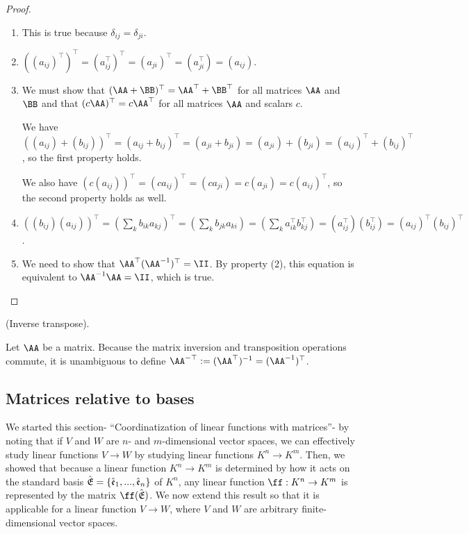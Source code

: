 \begin{proof}
    \mbox{} \\    
    \begin{enumerate}
        \item This is true because $\delta_{ij} = \delta_{ji}$.
        \item $((a_{ij})^\top)^\top = (a_{ij}^\top)^\top = (a_{ji})^\top = (a_{ji}^\top) = (a_{ij})$.
        \item We must show that $(\AA + \BB)^\top = \AA^\top + \BB^\top$ for all matrices $\AA$ and $\BB$ and that $(c\AA)^\top = c\AA^\top$ for all matrices $\AA$ and scalars $c$.

        We have $((a_{ij}) + (b_{ij}))^\top = (a_{ij} + b_{ij})^\top = (a_{ji} + b_{ji}) = (a_{ji}) + (b_{ji}) = (a_{ij})^\top + (b_{ij})^\top$, so the first property holds.

        We also have $(c(a_{ij}))^\top = (c a_{ij})^\top = (c a_{ji}) = c (a_{ji}) = c (a_{ij})^\top$, so the second property holds as well.
        
        \item $((b_{ij}) (a_{ij}))^\top = ( \sum_k b_{ik}a_{kj})^\top = (\sum_k b_{jk} a_{ki}) = (\sum_k a_{ik}^\top b_{kj}^\top) = (a_{ij}^\top) (b_{ij}^\top) = (a_{ij})^\top (b_{ij})^\top$.
        
        \item We need to show that $\AA^\top (\AA^{-1})^\top = \II$. By property (2), this equation is equivalent to $\AA^{-1} \AA = \II$, which is true.
    \end{enumerate}
\end{proof}

\begin{defn}
    (Inverse transpose).

    Let $\AA$ be a matrix. Because the matrix inversion and transposition operations commute, it is unambiguous to define $\AA^{-\top} := (\AA^{\top})^{-1} = (\AA^{-1})^\top$.
\end{defn}

\newpage

\subsection*{Matrices relative to bases}

We started this section- ``Coordinatization of linear functions with matrices''- by noting that if $V$ and $W$ are $n$- and $m$-dimensional vector spaces, we can effectively study linear functions $V \rightarrow W$ by studying linear functions $K^n \rightarrow K^m$. Then, we showed that because a linear function $K^n \rightarrow K^m$ is determined by how it acts on the standard basis ${\hat{\mathfrak{E}}} = \{\hat{\mathfrak{e}}_1, ..., \hat{\mathfrak{e}}_n\}$ of $K^n$, any linear function $\ff:K^n \rightarrow K^m$ is represented by the matrix $\ff(\sE)$. We now extend this result so that it is applicable for a linear function $V \rightarrow W$, where $V$ and $W$ are arbitrary finite-dimensional vector spaces.

